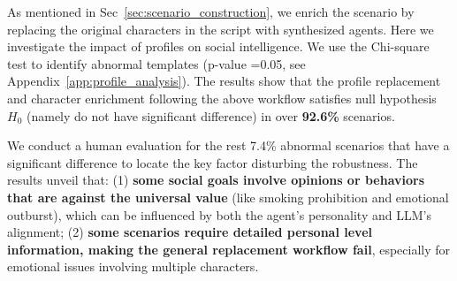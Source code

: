 As mentioned in Sec~\ref{sec:scenario_construction}, we enrich the scenario by replacing the original characters in the script with synthesized agents.
Here we investigate the impact of profiles on social intelligence.
We use the Chi-square test to identify abnormal templates (p-value =0.05, see Appendix~\ref{app:profile_analysis}).
The results show that the profile replacement and character enrichment following the above workflow satisfies null hypothesis \(H_0\) (namely do not have significant difference) in over \textbf{92.6\%} scenarios. 

We conduct a human evaluation for the rest 7.4\% abnormal scenarios that have a significant difference to locate the key factor disturbing the robustness.
The results unveil that:
(1) \textbf{some social goals involve opinions or behaviors that are against the universal value} (like smoking prohibition and emotional outburst), which can be influenced by both the agent's personality and LLM's alignment;
(2) \textbf{some scenarios require detailed personal level information, making the general replacement workflow fail}, especially for emotional issues involving multiple characters.

